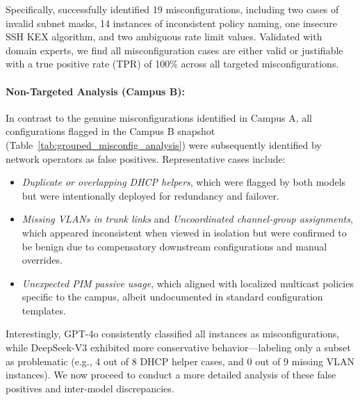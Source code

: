 Specifically, \sysname{} successfully identified 19 misconfigurations, including two cases of invalid subnet masks, 14 instances of inconsistent policy naming, one insecure SSH KEX algorithm, and two ambiguous rate limit values. Validated with domain experts, we find all misconfiguration cases are either valid or justifiable with a true positive rate (TPR) of 100\% across all targeted misconfigurations.

\paragraph{Non-Targeted Analysis (Campus B):}
In contrast to the genuine misconfigurations identified in Campus A, all configurations flagged in the Campus B snapshot (Table~\ref{tab:grouped_misconfig_analysis}) were subsequently identified by network operators as false positives. Representative cases include:

\begin{itemize}
\item \textit{Duplicate or overlapping DHCP helpers}, which were flagged by both models but were intentionally deployed for redundancy and failover.

\item \textit{Missing VLANs in trunk links} and \textit{Uncoordinated channel-group assignments}, which appeared inconsistent when viewed in isolation but were confirmed to be benign due to compensatory downstream configurations and manual overrides.

\item \textit{Unexpected PIM passive usage}, which aligned with localized multicast policies specific to the campus, albeit undocumented in standard configuration templates.
\end{itemize}

Interestingly, GPT-4o consistently classified all instances as misconfigurations, while DeepSeek-V3 exhibited more conservative behavior—labeling only a subset as problematic (e.g., 4 out of 8 DHCP helper cases, and 0 out of 9 missing VLAN instances). We now proceed to conduct a more detailed analysis of these false positives and inter-model discrepancies.




